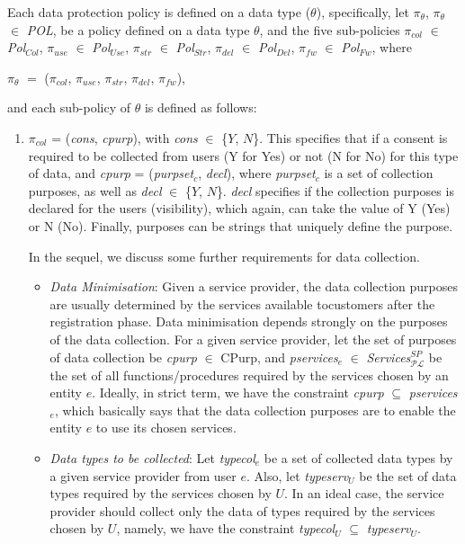 \documentclass[a4paper]{article}
\begin{document}
Each data protection policy is defined on a data type ($\theta$), specifically, let $\pi_{\theta}$, $\pi_{\theta}$ $\in$ \textit{POL}, be a policy defined on a data type $\theta$, and the five sub-policies $\pi_{col}$ $\in$ \textit{Pol}$_{Col}$, $\pi_{use}$ $\in$ \textit{Pol}$_{Use}$, $\pi_{str}$ $\in$ \textit{Pol}$_{Str}$, $\pi_{del}$ $\in$ \textit{Pol}$_{Del}$, $\pi_{fw}$ $\in$ \textit{Pol}$_{Fw}$, where  

\begin{center}
$\pi_{\theta}$ $=$ ($\pi_{col}$, $\pi_{use}$, $\pi_{str}$, $\pi_{del}$, $\pi_{fw}$),   
\end{center} 
 
and each sub-policy of $\theta$ is defined as follows: 
 
\begin{enumerate}
\item $\pi_{col}$ = (\textit{cons}, \textit{cpurp}), with \textit{cons} $\in$ \{$Y$, $N$\}. This specifies that if a consent is required to be collected from users (Y for Yes) or not (N for No) for this type of data, and \textit{cpurp} = (\textit{purpset}$_c$, \textit{decl}), where \textit{purpset}$_c$ is a set of collection purposes, as well as \textit{decl} $\in$ \{$Y$, $N$\}. \textit{decl} specifies if the collection purposes is declared for the users (visibility), which again, can take the value of Y (Yes) or N (No). Finally, purposes can be strings that uniquely define the purpose.  

In the sequel, we discuss some further requirements for data collection.     
 
\begin{itemize}
\item \textit{Data Minimisation}: Given a service provider, the data collection purposes are usually determined by the services available tocustomers after the registration phase.   
Data minimisation depends strongly on the purposes of the data collection. For a given service provider, let the set of purposes of data collection be \textit{cpurp} $\in$ CPurp, and \textit{pservices}$_e$ $\in$ \textit{Services}$^{SP}_{\mathcal{P}\mathcal{L}}$ be the set of all functions/procedures required by the services chosen by an entity $e$. Ideally, in strict term, we have the constraint \textit{cpurp} $\subseteq$ \textit{pservices}$_e$, which basically says that the data collection purposes are to enable the entity $e$ to use its chosen services.       

\item \textit{Data types to be collected}: Let \textit{typecol}$_e$ be a set of collected data types by a given service provider from user $e$. Also, let \textit{typeserv}$_{U}$ be the set of data types required by the services chosen by $U$. In an ideal case, the service provider should collect only the data of types required by the services chosen by $U$, namely, we have the constraint \textit{typecol}$_U$ $\subseteq$ \textit{typeserv}$_{U}$.


\end{itemize}
\end{enumerate}
\end{document}
